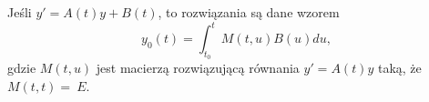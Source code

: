 %
\begin{theorem}
  Jeśli $y' = A(t)y + B(t)$, to rozwiązania są dane wzorem
%
  \begin{equation*}
    y_0(t) = \int_{t_0}^t M(t,u) B(u) du,
  \end{equation*}
%
  gdzie $M(t,u)$ jest macierzą rozwiązującą równania $y' = A(t)y$ taką, że $M(t,t) =~E$.
\end{theorem}

































